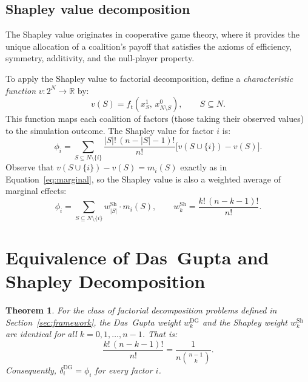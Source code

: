 \documentclass[11pt]{article}
\newtheorem{theorem}{Theorem}
\begin{document}
\subsection{Shapley value decomposition}
\label{sec:shapley}

The Shapley value \citep{shapley1953value} originates in cooperative
game theory, where it provides the unique allocation of a coalition's
payoff that satisfies the axioms of efficiency, symmetry, additivity,
and the null-player property.

To apply the Shapley value to factorial decomposition, define a
\emph{characteristic function} $v : 2^N \to \mathbb{R}$ by:
\begin{equation}
\label{eq:characteristic}
  v(S) = f_t(x_S^1, \, x_{N \setminus S}^0),
  \qquad S \subseteq N.
\end{equation}
This function maps each coalition of factors (those taking their
observed values) to the simulation outcome.
The Shapley value for factor $i$ is:
\begin{equation}
\label{eq:shapley}
  \phi_i
  = \sum_{S \subseteq N \setminus \{i\}}
    \frac{|S|! \, (n - |S| - 1)!}{n!}
    \bigl[ v(S \cup \{i\}) - v(S) \bigr].
\end{equation}
Observe that $v(S \cup \{i\}) - v(S) = m_i(S)$ exactly as in
Equation~\eqref{eq:marginal}, so the Shapley value is also a weighted
average of marginal effects:
\begin{equation}
\label{eq:shapley-weight}
  \phi_i
  = \sum_{S \subseteq N \setminus \{i\}}
    w_{|S|}^{\text{Sh}} \cdot m_i(S),
  \qquad
  w_k^{\text{Sh}} = \frac{k! \, (n - k - 1)!}{n!}.
\end{equation}


\section{Equivalence of Das~Gupta and Shapley Decomposition}
\label{sec:equivalence}

\begin{theorem}
\label{thm:equivalence}
For the class of factorial decomposition problems defined in
Section~\ref{sec:framework}, the Das~Gupta weight $w_k^{\mathrm{DG}}$
and the Shapley weight $w_k^{\mathrm{Sh}}$ are identical for all
$k = 0, 1, \ldots, n-1$.  That is:
\[
  \frac{k! \, (n - k - 1)!}{n!}
  = \frac{1}{n \binom{n-1}{k}}.
\]
Consequently, $\delta_i^{\mathrm{DG}} = \phi_i$ for every factor $i$.
\end{theorem}
\end{document}
